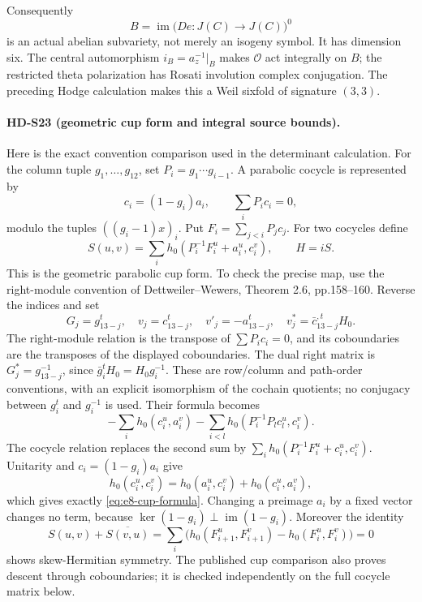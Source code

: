 Consequently
\[
 B=\operatorname{im}\bigl(De:J(C)\longrightarrow J(C)\bigr)^0
\]
is an actual abelian subvariety, not merely an isogeny symbol.
It has dimension six. The central automorphism \(i_B=a_z^{-1}|_B\) makes
\(\mathcal O\) act integrally on \(B\); the restricted theta
polarization has Rosati involution complex conjugation. The preceding
Hodge calculation makes this a Weil sixfold of signature \((3,3)\).

\paragraph{HD-S23 (geometric cup form and integral source bounds).}
Here is the exact convention comparison used in the determinant
calculation. For the column tuple \(g_1,\ldots,g_{12}\), set
\(P_i=g_1\cdots g_{i-1}\). A parabolic cocycle is represented by
\[
 c_i=(1-g_i)a_i,\qquad \sum_iP_ic_i=0,
\]
modulo the tuples \(((g_i-1)x)_i\). Put
\(F_i=\sum_{j<i}P_jc_j\). For two cocycles define
\begin{equation}\label{eq:e8-cup-formula}
 S(u,v)=\sum_i h_0(P_i^{-1}F_i^u+a_i^u,c_i^v),\qquad H=iS.
\end{equation}
This is the geometric parabolic cup form. To check the precise map,
use the right-module convention of Dettweiler--Wewers,
Theorem 2.6, pp.158--160. Reverse the indices and set
\[
 G_j=g_{13-j}^t,\quad v_j=c_{13-j}^t,\quad
 v'_j=-a_{13-j}^t,\quad v_j^*=\bar c_{13-j}^{,t}H_0.
\]
The right-module relation is the transpose of \(\sum P_ic_i=0\),
and its coboundaries are the transposes of the displayed coboundaries.
The dual right matrix is \(G_j^*=g_{13-j}^{-1}\), since
\(\bar g_i^tH_0=H_0g_i^{-1}\). These are row/column and path-order
conventions, with an explicit isomorphism of the cochain quotients;
no conjugacy between \(g_i^t\) and \(g_i^{-1}\) is used.
Their formula becomes
\[
 -\sum_i h_0(c_i^u,a_i^v)
 -\sum_{i<l}h_0(P_i^{-1}P_lc_l^u,c_i^v).
\]
The cocycle relation replaces the second sum by
\(\sum_i h_0(P_i^{-1}F_i^u+c_i^u,c_i^v)\).
Unitarity and \(c_i=(1-g_i)a_i\) give
\[
 h_0(c_i^u,c_i^v)=h_0(a_i^u,c_i^v)+h_0(c_i^u,a_i^v),
\]
which gives exactly \eqref{eq:e8-cup-formula}.
Changing a preimage \(a_i\) by a fixed vector changes no term,
because \(\ker(1-g_i)\perp\operatorname{im}(1-g_i)\).
Moreover the identity
\[
 S(u,v)+\overline{S(v,u)}
 =\sum_i\bigl(h_0(F_{i+1}^u,F_{i+1}^v)
                  -h_0(F_i^u,F_i^v)\bigr)=0
\]
shows skew-Hermitian symmetry. The published cup comparison also
proves descent through coboundaries; it is checked independently on
the full cocycle matrix below.


